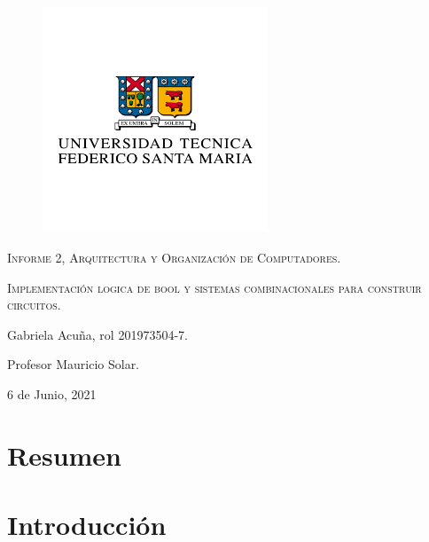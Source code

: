 \documentclass[12pt]{article}
\begin{document}
\begin{titlepage}
    \centering

    \begin{figure}[t!]
        \centering
      \includegraphics[keepaspectratio, width=0.6\textwidth]{logoUSM.png}
    \end{figure}
    {\scshape\Large Informe 2, Arquitectura y Organización de Computadores. \par}
    \vspace{1.5cm}
    {\scshape\Huge Implementación logica de bool y sistemas combinacionales para construir circuitos.  \par}
    \vspace{1.5cm}
    {\Large Gabriela Acuña, rol 201973504-7.\par}
    \vspace{0.2cm}
    {\Large Profesor Mauricio Solar.}
    \vfill
    {\Large  6 de Junio, 2021 \par}

\end{titlepage}

\tableofcontents
\clearpage


\section{Resumen}


\section{Introducción}
\end{document}
